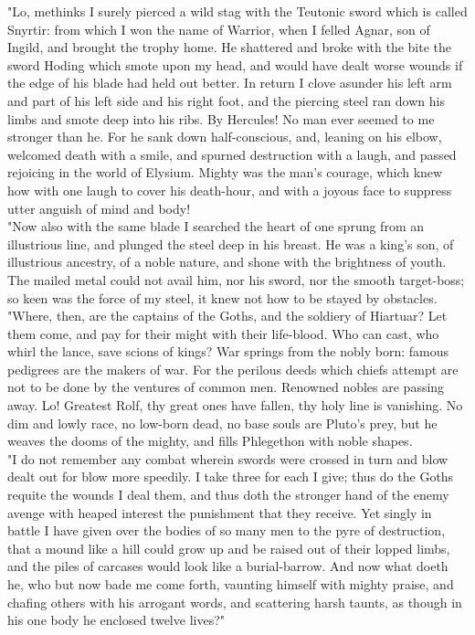 \documentclass[10pt,a4paper]{report}
\begin{document}
"Lo, methinks I surely pierced a wild stag with the Teutonic sword which is called Snyrtir: from which I won the name of Warrior, when I felled Agnar, son of Ingild, and brought the trophy home. He shattered and broke with the bite the sword Hoding which smote upon my head, and would have dealt worse wounds if the edge of his blade had held out better. In return I clove asunder his left arm and part of his left side and his right foot, and the piercing steel ran down his limbs and smote deep into his ribs. By Hercules! No man ever seemed to me stronger than he. For he sank down half-conscious, and, leaning on his elbow, welcomed death with a smile, and spurned destruction with a laugh, and passed rejoicing in the world of Elysium. Mighty was the man's courage, which knew how with one laugh to cover his death-hour, and with a joyous face to suppress utter anguish of mind and body!\\

"Now also with the same blade I searched the heart of one sprung from an illustrious line, and plunged the steel deep in his breast. He was a king's son, of illustrious ancestry, of a noble nature, and shone with the brightness of youth. The mailed metal could not avail him, nor his sword, nor the smooth target-boss; so keen was the force of my steel, it knew not how to be stayed by obstacles.\\

"Where, then, are the captains of the Goths, and the soldiery of Hiartuar? Let them come, and pay for their might with their life-blood. Who can cast, who whirl the lance, save scions of kings? War springs from the nobly born: famous pedigrees are the makers of war. For the perilous deeds which chiefs attempt are not to be done by the ventures of common men. Renowned nobles are passing away. Lo! Greatest Rolf, thy great ones have fallen, thy holy line is vanishing. No dim and lowly race, no low-born dead, no base souls are Pluto's prey, but he weaves the dooms of the mighty, and fills Phlegethon with noble shapes.\\

"I do not remember any combat wherein swords were crossed in turn and blow dealt out for blow more speedily. I take three for each I give; thus do the Goths requite the wounds I deal them, and thus doth the stronger hand of the enemy avenge with heaped interest the punishment that they receive. Yet singly in battle I have given over the bodies of so many men to the pyre of destruction, that a mound like a hill could grow up and be raised out of their lopped limbs, and the piles of carcases would look like a burial-barrow. And now what doeth he, who but now bade me come forth, vaunting himself with mighty praise, and chafing others with his arrogant words, and scattering harsh taunts, as though in his one body he enclosed twelve lives?"\\
\end{document}
